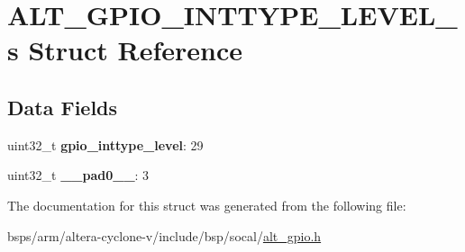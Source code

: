 \hypertarget{structALT__GPIO__INTTYPE__LEVEL__s}{}\section{A\+L\+T\+\_\+\+G\+P\+I\+O\+\_\+\+I\+N\+T\+T\+Y\+P\+E\+\_\+\+L\+E\+V\+E\+L\+\_\+s Struct Reference}
\label{structALT__GPIO__INTTYPE__LEVEL__s}
\subsection*{Data Fields}
\begin{DoxyCompactItemize}
\item 
\mbox{\label{structALT__GPIO__INTTYPE__LEVEL__s_a0ec0c925afe057e3b66c8fec44b54bdb}} 
uint32\+\_\+t {\bfseries gpio\+\_\+inttype\+\_\+level}\+: 29
\item 
\mbox{\label{structALT__GPIO__INTTYPE__LEVEL__s_a710e8c06645708b808f34f237a01f3ac}} 
uint32\+\_\+t {\bfseries \+\_\+\+\_\+pad0\+\_\+\+\_\+}\+: 3
\end{DoxyCompactItemize}


The documentation for this struct was generated from the following file\+:\begin{DoxyCompactItemize}
\item 
bsps/arm/altera-\/cyclone-\/v/include/bsp/socal/\mbox{\hyperlink{alt__gpio_8h}{alt\+\_\+gpio.\+h}}\end{DoxyCompactItemize}
